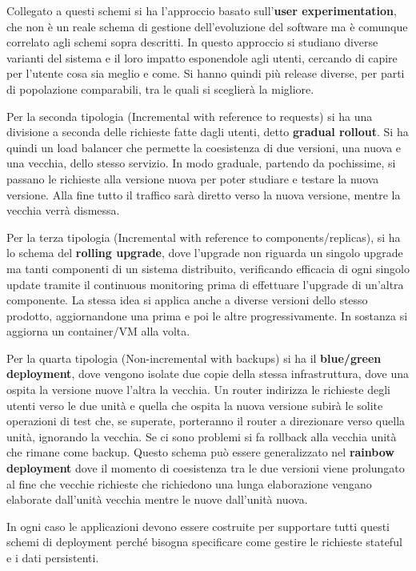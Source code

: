 Collegato a questi schemi si ha l'approccio basato sull'\textbf{user experimentation},
che non è un reale schema di gestione dell'evoluzione del software ma è comunque
correlato agli schemi sopra descritti. In questo approccio si studiano diverse
varianti del sistema e il loro impatto esponendole agli utenti, cercando di capire
per l'utente cosa sia meglio e come. Si hanno quindi più release diverse, per
parti di popolazione comparabili, tra le quali si sceglierà la migliore.

Per la seconda tipologia (Incremental with reference to requests) si ha una
divisione a seconda delle richieste fatte dagli utenti, detto \textbf{gradual
      rollout}. Si ha quindi un load balancer che permette la coesistenza di due
versioni, una nuova e una vecchia, dello stesso servizio. In modo graduale,
partendo da pochissime, si passano le richieste alla versione nuova per poter
studiare e testare la nuova versione. Alla fine tutto il traffico sarà diretto
verso la nuova versione, mentre la vecchia verrà dismessa.

Per la terza tipologia (Incremental with reference to components/replicas),
si ha lo schema del \textbf{rolling upgrade}, dove l'upgrade non riguarda un
singolo upgrade ma tanti componenti di un sistema distribuito, verificando efficacia
di ogni singolo update tramite il continuous monitoring prima di effettuare l'upgrade
di un'altra componente. La stessa idea si applica anche a diverse versioni dello
stesso prodotto, aggiornandone una prima e poi le altre progressivamente. In
sostanza si aggiorna un container/VM alla volta.

Per la quarta tipologia (Non-incremental with backups) si ha il
\textbf{blue/green deployment}, dove vengono isolate due copie della stessa
infrastruttura, dove una ospita la versione nuove l'altra la vecchia. Un router
indirizza le richieste degli utenti verso le due unità e quella che ospita la
nuova versione subirà le solite operazioni di test che, se superate, porteranno
il router a direzionare verso quella unità, ignorando la vecchia. Se ci sono problemi
si fa rollback alla vecchia unità che rimane come backup. Questo schema può essere
generalizzato nel \textbf{rainbow deployment} dove il momento di coesistenza tra le due
versioni viene prolungato al fine che vecchie richieste che richiedono una lunga
elaborazione vengano elaborate dall'unità vecchia mentre le nuove dall'unità nuova.

In ogni caso le applicazioni devono essere costruite per supportare tutti questi
schemi di deployment perché bisogna specificare come gestire le richieste stateful
e i dati persistenti.
